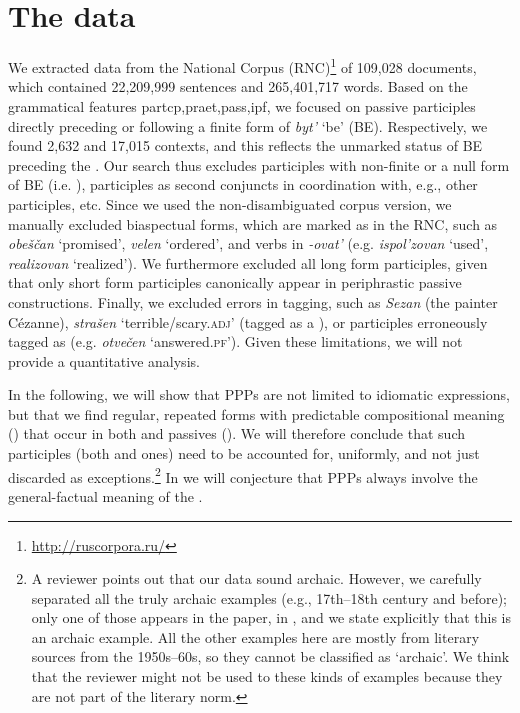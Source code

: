 \documentclass[output=paper,modfonts,newtxmath,hidelinks]{langscibook}
\begin{document}
\section{The data}
\label{data}

We extracted data from the  National Corpus (RNC)\footnote{\url{http://ruscorpora.ru/}} of 109,028 documents, which contained 22,209,999 sentences and 265,401,717 words.  Based on the grammatical features partcp,praet,pass,ipf, we focused on   passive participles directly preceding or following a finite form of \textit{byt'} `be' (BE). Respectively, we found 2,632 and 17,015 contexts, and this reflects the unmarked  status of BE preceding the . Our search thus excludes participles with non-finite or a null form of BE (i.e. ), participles as second conjuncts in coordination with, e.g., other participles, etc. Since we used the non-disambiguated corpus version, we manually excluded biaspectual forms, which are marked as  in the RNC, such as \textit{obeščan} `promised', \textit{velen} `ordered', and verbs in \textit{-ovat'} (e.g. \textit{ispol'zovan} `used', \textit{realizovan} `realized'). We furthermore excluded all long form participles, given that only short form participles canonically appear in  periphrastic passive constructions. Finally, we excluded errors in tagging, such as \textit{Sezan} (the  painter Cézanne), \textit{strašen} `terrible/scary.\textsc{adj}' (tagged as a ), or  participles erroneously tagged as  (e.g. \textit{otvečen} `answered.\textsc{pf}'). Given these limitations, we will not provide a quantitative analysis. 
 
\largerpage
In the following, we will show that  PPPs are not limited to idiomatic expressions, but that we find regular, repeated forms with predictable compositional meaning () that occur in both  and  passives (). We will therefore conclude that such participles (both  and  ones) need to be accounted for, uniformly, and not just discarded as exceptions.\footnote{A reviewer points out that our data sound archaic. However, we carefully separated all the truly archaic examples (e.g., 17th--18th century and before); only one of those appears in the paper, in , and we state explicitly that this is an archaic example. All the other examples here are mostly from literary sources from the 1950s--60s, so they cannot be classified as `archaic'. We think that the reviewer might not be used to these kinds of examples because they are not part of the literary norm.} In  we will conjecture that  PPPs always involve the general-factual meaning of the .
\end{document}
